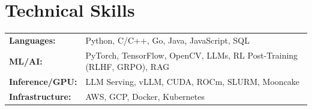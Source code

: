 \documentclass[a4paper,11pt]{article}
\begin{document}
\section{Technical Skills}
\begin{tabular*}{0.97\textwidth}{@{}l@{\hskip 12pt}l@{}}
  \textbf{Languages:} & Python, C/C++, Go, Java, JavaScript, SQL \\
  \textbf{ML/AI:} & PyTorch, TensorFlow, OpenCV, LLMs, RL Post-Training (RLHF, GRPO), RAG \\
  \textbf{Inference/GPU:} & LLM Serving, vLLM, CUDA, ROCm, SLURM, Mooncake \\
  \textbf{Infrastructure:} & AWS, GCP, Docker, Kubernetes \\
\end{tabular*}
\end{document}
